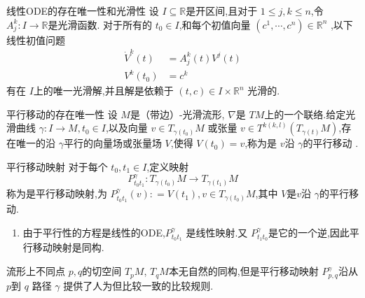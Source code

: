 \documentclass[../../几何与拓扑.tex]{subfiles}
\begin{document}
\begin{theorem}{线性ODE的存在唯一性和光滑性}
    设 \(  I\subseteq \mathbb{R}   \)是开区间,且对于 \(  1\le j,k\le n  \),令 \(  A_{j}^{k}:I\to \mathbb{R}   \)是光滑函数.
    对于所有的 \(  t_0 \in I  \),和每个初值向量 \(  \left(  c^1,\cdots,c^n  \right)\in \mathbb{R} ^{n}   \)     ,以下线性初值问题 \[
    \begin{aligned}
    \dot{V}^{k}\left( t \right)& =  A_{j}^{k}\left( t \right)V^{j}\left( t \right)\\ 
     V^{k}\left( t_0 \right)& =  c^{k}     
    \end{aligned}
    \]有在 \(  I  \)上的唯一光滑解,并且解是依赖于 \(  \left( t,c \right) \in I\times \mathbb{R} ^{n}   \)  光滑的.
\end{theorem}


\begin{theorem}{平行移动的存在唯一性}
    设 \(  M  \)是（带边）-光滑流形,  \(   \nabla   \)是 \(  TM  \)上的一个联络.给定光滑曲线 \(   \gamma : I\to M  , t_0 \in I\),以及向量 \(  v \in T_{ \gamma \left( t_0 \right) }M  \) 
    或张量 \(  v \in T^{k\left( k,l \right) }\left( T_{ \gamma \left( t \right) }M \right)   \),存在唯一的沿 \(   \gamma   \)平行的向量场或张量场 \(  V  \),使得 \(  V\left( t_0 \right)= v   \),称为是 \(  v  \)沿 \(   \gamma   \)的平行移动  .        
\end{theorem}


\begin{definition}{平行移动映射}
    对于每个 \(  t_0 ,t_1 \in I  \),定义映射 \[
    P_{t_0t_1}^{ \gamma }: T_{ \gamma \left( t_0 \right) }M\to T_{ \gamma \left( t_1 \right) }M
    \]称为是平行移动映射,为 \(  P_{t_0t_1}^{ \gamma }\left( v \right): =  V\left( t_1 \right), v \in T_{ \gamma \left( t_0 \right) }M    \),其中 \(  V  \)是\(   v  \)沿 \(   \gamma   \)的平行移动.     
\end{definition}

\begin{remark}
    \begin{enumerate}
        \item  由于平行性的方程是线性的ODE,\(  P_{t_0t_1}^{ \gamma }  \) 是线性映射.又 \(  P_{t_1t_0}^{ \gamma }  \)是它的一个逆,因此平行移动映射是同构. 
    \end{enumerate}
    
\end{remark}

\begin{note}
    流形上不同点 \(  p,q  \)的切空间 \(  T_{p}M  \), \(  T_{q}M  \)本无自然的同构,但是平行移动映射 \(  P^{\gamma }_{p,q}  \)沿从 \(  p  \)到 \(  q  \)  路径 \(   \gamma   \)   
    提供了人为但比较一致的比较规则.  
\end{note}
\end{document}
